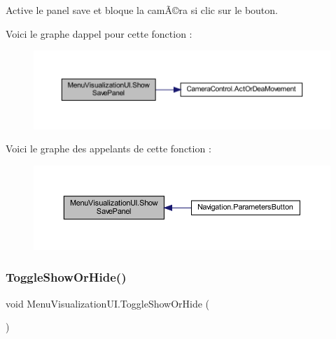 Active le panel save et bloque la camÃ©ra si clic sur le bouton. 

Voici le graphe d\textquotesingle{}appel pour cette fonction \+:
\nopagebreak
\begin{figure}[H]
\begin{center}
\leavevmode
\includegraphics[width=350pt]{class_menu_visualization_u_i_aabfef8a72ef59e04916f6d95a1274431_cgraph}
\end{center}
\end{figure}
Voici le graphe des appelants de cette fonction \+:
\nopagebreak
\begin{figure}[H]
\begin{center}
\leavevmode
\includegraphics[width=350pt]{class_menu_visualization_u_i_aabfef8a72ef59e04916f6d95a1274431_icgraph}
\end{center}
\end{figure}
\mbox{\label{class_menu_visualization_u_i_acc1ed888dd19359811e473ffbd2fa86a}} 
\subsubsection{\texorpdfstring{Toggle\+Show\+Or\+Hide()}{ToggleShowOrHide()}}
{\footnotesize\ttfamily void Menu\+Visualization\+U\+I.\+Toggle\+Show\+Or\+Hide (\begin{DoxyParamCaption}{ }\end{DoxyParamCaption})\hspace{0.3cm}{\ttfamily [inline]}}



